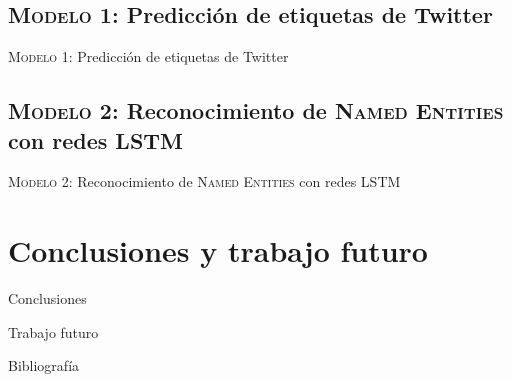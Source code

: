\documentclass[10pt]{beamer}
\begin{document}
\subsection{\textsc{Modelo 1:} Predicción de etiquetas de Twitter}

\begin{frame}{\textsc{Modelo 1:} Predicción de etiquetas de Twitter}
\end{frame}

\subsection{\textsc{Modelo 2:} Reconocimiento de \textsc{Named Entities} con redes \textsc{LSTM}}

\begin{frame}{\textsc{Modelo 2:} Reconocimiento de \textsc{Named Entities} con redes \textsc{LSTM}}
\end{frame}

\section{Conclusiones y trabajo futuro}

\begin{frame}{Conclusiones}
\end{frame}

\begin{frame}{Trabajo futuro}
\end{frame}

\appendix
{}
\begin{frame}[allowframebreaks]{Bibliografía}

  
  

\end{frame}
\end{document}
